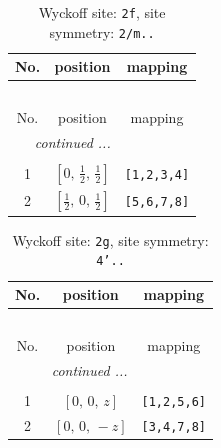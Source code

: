 \documentclass[fleqn,8pt]{jsarticle}
\begin{document}
\renewcommand{\arraystretch}{1.2}
\begin{longtable}{ccc}
\caption{Wyckoff site: {\tt 2f}, site symmetry: {\tt 2/m..}}
 \\
 \hline \hline
No. & position & mapping \\ \hline \endfirsthead

\multicolumn{2}{l}{\tablename\ \thetable{}} \\
 \hline \hline
No. & position & mapping \\ \hline \endhead

 \hline \hline
\multicolumn{2}{r}{\footnotesize\it continued ...} \\ \endfoot

 \hline \hline
\multicolumn{2}{r}{} \\ \endlastfoot

1 & $\left[ 0,\, \frac{1}{2},\, \frac{1}{2} \right]$ & {\tt [1,2,3,4]} \\ \hline
2 & $\left[ \frac{1}{2},\, 0,\, \frac{1}{2} \right]$ & {\tt [5,6,7,8]} \\
\end{longtable}
\renewcommand{\arraystretch}{1.2}
\begin{longtable}{ccc}
\caption{Wyckoff site: {\tt 2g}, site symmetry: {\tt 4'..}}
 \\
 \hline \hline
No. & position & mapping \\ \hline \endfirsthead

\multicolumn{2}{l}{\tablename\ \thetable{}} \\
 \hline \hline
No. & position & mapping \\ \hline \endhead

 \hline \hline
\multicolumn{2}{r}{\footnotesize\it continued ...} \\ \endfoot

 \hline \hline
\multicolumn{2}{r}{} \\ \endlastfoot

1 & $\left[ 0,\, 0,\, z \right]$ & {\tt [1,2,5,6]} \\ \hline
2 & $\left[ 0,\, 0,\, - z \right]$ & {\tt [3,4,7,8]} \\
\end{longtable}
\renewcommand{\arraystretch}{1.2}
\end{document}

